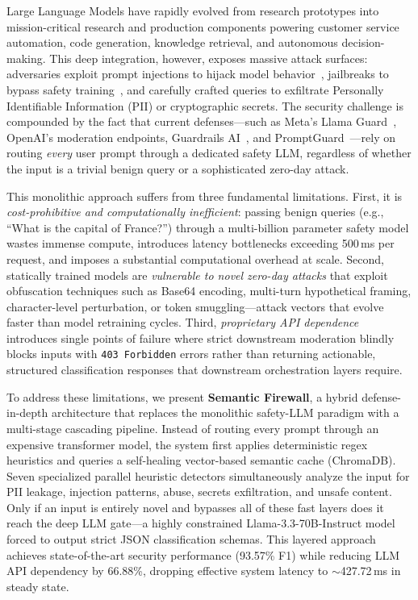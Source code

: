 \documentclass[conference]{IEEEtran}
\begin{document}
Large Language Models have rapidly evolved from research prototypes
into mission-critical research and production components powering customer service
automation, code generation, knowledge retrieval, and autonomous
decision-making. This deep integration, however, exposes massive attack
surfaces: adversaries exploit prompt injections to hijack model
behavior~\cite{surveyprompt,owasptop10}, jailbreaks to bypass safety training~\cite{autodan,pair}, and carefully crafted
queries to exfiltrate Personally Identifiable Information (PII) or
cryptographic secrets. The security challenge is compounded by the fact
that current defenses---such as Meta's Llama
Guard~\cite{llamaguard}, OpenAI's moderation endpoints, Guardrails AI~\cite{guardrailsai}, and
PromptGuard~\cite{promptguard}---rely on routing \textit{every} user
prompt through a dedicated safety LLM, regardless of whether the input
is a trivial benign query or a sophisticated zero-day attack.

This monolithic approach suffers from three fundamental limitations.
First, it is \textit{cost-prohibitive and computationally inefficient}:
passing benign queries (e.g., ``What is the capital of France?'')
through a multi-billion parameter safety model wastes immense compute,
introduces latency bottlenecks exceeding 500\,ms per request, and
imposes a substantial computational overhead at scale. Second, statically trained
models are \textit{vulnerable to novel zero-day attacks} that exploit
obfuscation techniques such as Base64 encoding, multi-turn hypothetical
framing, character-level perturbation, or token smuggling---attack
vectors that evolve faster than model retraining cycles. Third,
\textit{proprietary API dependence} introduces single points of failure
where strict downstream moderation blindly blocks inputs with
\texttt{403 Forbidden} errors rather than returning actionable,
structured classification responses that downstream orchestration
layers require.

To address these limitations, we present \textbf{Semantic Firewall}, a
hybrid defense-in-depth architecture that replaces the monolithic
safety-LLM paradigm with a multi-stage cascading pipeline. Instead of
routing every prompt through an expensive transformer model, the system
first applies deterministic regex heuristics and queries a self-healing
vector-based semantic cache (ChromaDB). Seven specialized parallel
heuristic detectors simultaneously analyze the input for PII leakage,
injection patterns, abuse, secrets exfiltration, and unsafe content.
Only if an input is entirely novel and bypasses all of these fast
layers does it reach the deep LLM gate---a highly constrained
Llama-3.3-70B-Instruct model forced to output strict JSON
classification schemas. This layered approach achieves state-of-the-art
security performance (93.57\% F1) while reducing LLM API dependency by
66.88\%, dropping effective system latency to $\sim$427.72\,ms in
steady state.
\end{document}
